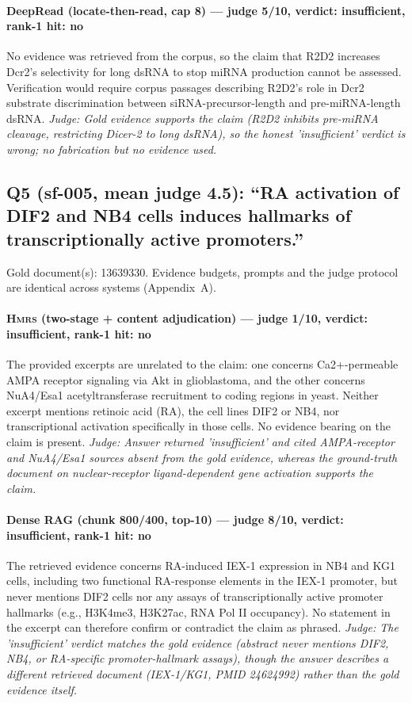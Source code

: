 \documentclass[sigconf, review, anonymous]{acmart}
\begin{document}
\paragraph{DeepRead (locate-then-read, cap 8) --- judge 5/10, verdict: insufficient, rank-1 hit: no}
\noindent No evidence was retrieved from the corpus, so the claim that R2D2 increases Dcr2's selectivity for long dsRNA to stop miRNA production cannot be assessed. Verification would require corpus passages describing R2D2's role in Dcr2 substrate discrimination between siRNA-precursor-length and pre-miRNA-length dsRNA.
\noindent\small\textit{Judge: Gold evidence supports the claim (R2D2 inhibits pre-miRNA cleavage, restricting Dicer-2 to long dsRNA), so the honest 'insufficient' verdict is wrong; no fabrication but no evidence used.}

\subsection{Q5 (sf-005, mean judge 4.5): ``RA activation of DIF2 and NB4 cells induces hallmarks of transcriptionally active promoters.''}
\label{app:q5}
\noindent Gold document(s): 13639330. Evidence budgets, prompts and the judge protocol are identical across systems (Appendix~A).
\paragraph{\textbf{\textsc{Hmrs}} (two-stage + content adjudication) --- judge 1/10, verdict: insufficient, rank-1 hit: no}
\noindent The provided excerpts are unrelated to the claim: one concerns Ca2+-permeable AMPA receptor signaling via Akt in glioblastoma, and the other concerns NuA4/Esa1 acetyltransferase recruitment to coding regions in yeast. Neither excerpt mentions retinoic acid (RA), the cell lines DIF2 or NB4, nor transcriptional activation specifically in those cells. No evidence bearing on the claim is present.
\noindent\small\textit{Judge: Answer returned 'insufficient' and cited AMPA-receptor and NuA4/Esa1 sources absent from the gold evidence, whereas the ground-truth document on nuclear-receptor ligand-dependent gene activation supports the claim.}
\paragraph{Dense RAG (chunk 800/400, top-10) --- judge 8/10, verdict: insufficient, rank-1 hit: no}
\noindent The retrieved evidence concerns RA-induced IEX-1 expression in NB4 and KG1 cells, including two functional RA-response elements in the IEX-1 promoter, but never mentions DIF2 cells nor any assays of transcriptionally active promoter hallmarks (e.g., H3K4me3, H3K27ac, RNA Pol II occupancy). No statement in the excerpt can therefore confirm or contradict the claim as phrased.
\noindent\small\textit{Judge: The 'insufficient' verdict matches the gold evidence (abstract never mentions DIF2, NB4, or RA-specific promoter-hallmark assays), though the answer describes a different retrieved document (IEX-1/KG1, PMID 24624992) rather than the gold evidence itself.}
\end{document}
